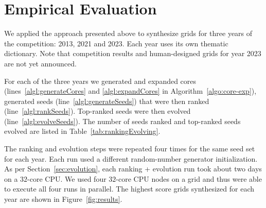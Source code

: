 \section{Empirical Evaluation}

We applied the approach presented above to synthesize grids for three years of the competition: 2013, 2021 and 2023. Each year uses its own thematic dictionary. Note that competition results and human-designed grids for year 2023 are not yet announced.

For each of the three years we generated and expanded cores (lines~\ref{algl:generateCores} and \ref{algl:expandCores} in Algorithm~\ref{algo:core-exp}), generated seeds (line~\ref{algl:generateSeeds}) that were then ranked (line~\ref{algl:rankSeeds}). Top-ranked seeds were then evolved (line~\ref{algl:evolveSeeds}). The number of seeds ranked and top-ranked seeds evolved are listed in Table~\ref{tab:rankingEvolving}.

The ranking and evolution steps were repeated four times for the same seed set for each year. Each run used a different random-number generator initialization. As per Section~\ref{sec:evolution}, each ranking + evolution run took about two days on a $32$-core CPU. We used four $32$-core CPU nodes on a grid and thus were able to execute all four runs in parallel. The highest score grids synthesized for each year are shown in Figure~\ref{fig:results}. 




